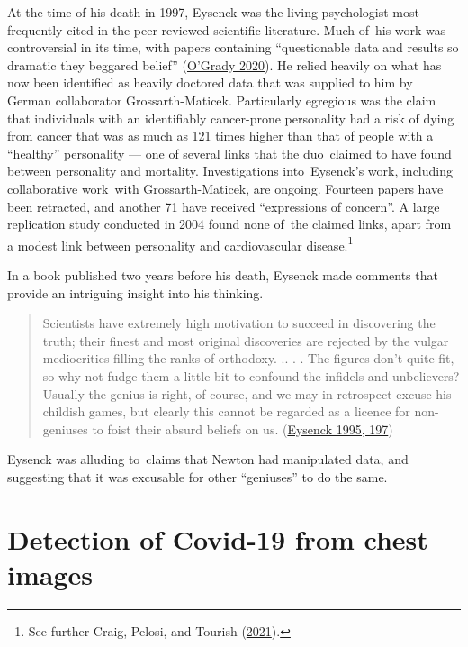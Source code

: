 \documentclass[
  10ptls,
  b5paper]{book}
\begin{document}
At the time of his death in 1997, Eysenck was the living psychologist
most frequently cited in the peer-reviewed scientific literature.
Much of~his work was controversial in its time, with papers
containing ``questionable data and results so dramatic they beggared
belief'' (\protect\hyperlink{ref-o2020famous}{O'Grady 2020}). He relied heavily on what has now been
identified as heavily doctored data that was supplied to him by
German collaborator Grossarth-Maticek. Particularly egregious was
the claim that individuals with an identifiably cancer-prone personality
had a risk of dying from cancer that was as much as 121 times higher
than that of people with a ``healthy'' personality --- one of several
links that the duo~claimed to have found between personality and
mortality. Investigations into~Eysenck's work, including
collaborative work~with Grossarth-Maticek, are ongoing. Fourteen
papers have been retracted, and another 71 have received
``expressions of concern''. A large replication study conducted in
2004 found none of~the claimed links, apart from a modest link between
personality and cardiovascular disease.\footnote{See further Craig, Pelosi, and Tourish (\protect\hyperlink{ref-CraigEtAl}{2021}).}

In a book published two years before his death, Eysenck made
comments that provide an intriguing insight into his thinking.

\begin{quote}
Scientists have extremely high motivation to succeed in discovering the truth; their finest and most original discoveries are rejected by the vulgar mediocrities filling the ranks of orthodoxy. .. . . The figures don't quite fit, so why not fudge them a little bit to confound the infidels and unbelievers? Usually the genius is right, of course, and we may in retrospect excuse his childish games, but clearly this cannot be regarded as a licence for non-geniuses to foist their absurd beliefs on us. (\protect\hyperlink{ref-eysenck1995genius}{Eysenck 1995, 197})
\end{quote}

Eysenck was alluding to~claims that Newton had manipulated data, and
suggesting that it was excusable for other ``geniuses'' to do the same.

\hypertarget{detection-of-covid-19-from-chest-images}{%
\section{Detection of Covid-19 from chest images}\label{detection-of-covid-19-from-chest-images}}
\end{document}
